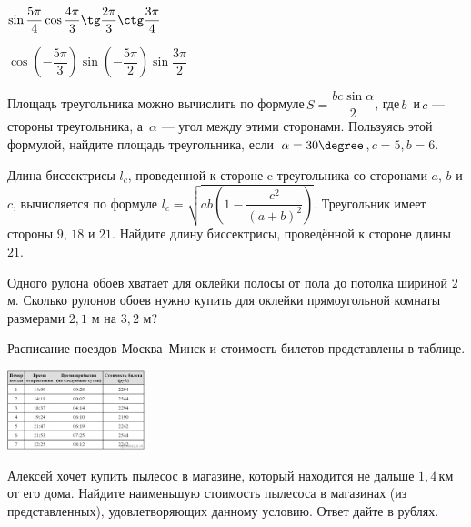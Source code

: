 \begin{class}[number=1]
\begin{listofex}
\begin{enumcols}[itemcolumns=2]
			\item \( \sin\dfrac{5\pi}{4}\cos\dfrac{4\pi}{3}\tg\dfrac{2\pi}{3}\ctg\dfrac{3\pi}{4} \)
			\item \( \cos\left( -\dfrac{5\pi}{3} \right)\sin\left( -\dfrac{5\pi}{2} \right)\sin\dfrac{3\pi}{2} \)
		\end{enumcols}
		\item Площадь треугольника можно вычислить по формуле \( S=\dfrac{bc\sin \alpha}{2} \),  где \( b \)  и \( c \)  --- стороны треугольника, а  \( \alpha \) --- угол между этими сторонами. Пользуясь этой формулой, найдите площадь треугольника, если  \( \alpha = 30\degree \), \( c = 5 \), \( b = 6 \).
		\item Длина биссектрисы \( l_c \), проведенной к стороне c треугольника со сторонами \( a \), \( b \) и \( c \), вычисляется по формуле \( l_c=\sqrt{ab\left( 1-\dfrac{c^2}{(a+b)^2} \right)} \). Треугольник имеет стороны \( 9 \), \( 18 \) и \( 21 \). Найдите длину биссектрисы, проведённой к стороне длины \( 21 \).
		\item Одного рулона обоев хватает для оклейки полосы от пола до потолка шириной \( 2 \) м. Сколько рулонов обоев нужно купить для оклейки прямоугольной комнаты размерами \( 2,1 \) м на \( 3,2 \) м?
		\item Расписание поездов Москва–Минск и стоимость билетов представлены в таблице.
		\begin{center}
			\includegraphics[align=t, width=0.3\textwidth]{pics/G116M4L1-1}
		\end{center}
		Алексей хочет купить пылесос в магазине, который находится не дальше \( 1,4 \) км от его дома. Найдите наименьшую стоимость пылесоса в магазинах (из представленных), удовлетворяющих данному условию. Ответ дайте в рублях.
	\end{listofex}
\end{class}
%
%
%
%
